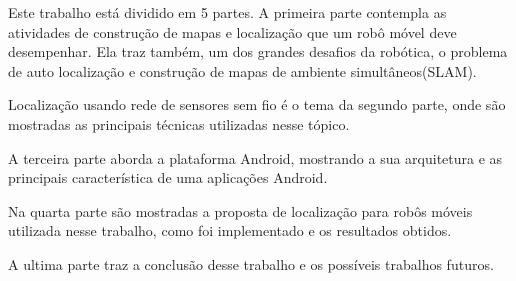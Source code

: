   Este trabalho está dividido em 5 partes. 
  A primeira parte contempla as atividades de construção de mapas e localização que um robô móvel deve desempenhar. 
  Ela traz também, um dos grandes desafios da robótica, 
  o problema de auto localização e construção de mapas de ambiente simultâneos(SLAM).
  
  Localização usando rede de sensores sem fio é o tema da segundo parte, onde são mostradas as principais técnicas utilizadas nesse tópico.
  
  A terceira parte aborda a plataforma Android, mostrando a sua arquitetura e as principais característica de uma aplicações Android.
  
  Na quarta parte são mostradas a proposta de localização para robôs móveis utilizada nesse trabalho, como foi implementado e os resultados obtidos.
  
  A ultima parte traz a conclusão desse trabalho e os possíveis trabalhos futuros.

\begin{comment}
  A primeira parte aborda o tópico construção de mapas, apresentando as principais técnicas de construção de mapas e mostra um pouco sobre o problema de auto localização e mapeamento simultâneos.
  
  A segunda parte mostra como pode-se obter a localização de um nodo, utilizando redes de sensores sem fio, e trás um resumo do método de localização a ser utilizado no sistema 
  de navegação.
  
  A terceira parte apresenta o problema planejamento de trajetos, e mostra algumas técnicas utilizadas na solução desse problema.
  
  A quarta parte mostra como será implementado o sistema proposto nesse trabalho, para as plataformas Android e Arduino.
  
  A quinta parte faz a conclusão desse trabalho e apresenta uma breve discussão sobre trabalhos futuros.
\end{comment}
